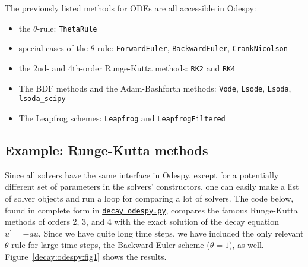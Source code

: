 \documentclass[graybox,sectrefs,envcountresetchap,open=right,final]{svmonodo}
\begin{document}
The previously listed methods for ODEs are all accessible in
Odespy:

\begin{itemize}
 \item the $\theta$-rule: \texttt{ThetaRule}

 \item special cases of the $\theta$-rule: \texttt{ForwardEuler}, \texttt{BackwardEuler},
   \texttt{CrankNicolson}

 \item the 2nd- and 4th-order Runge-Kutta methods: \texttt{RK2} and \texttt{RK4}

 \item The BDF methods and the Adam-Bashforth methods:
   \texttt{Vode}, \texttt{Lsode}, \texttt{Lsoda}, \Verb!lsoda_scipy!

 \item The Leapfrog schemes: \texttt{Leapfrog} and \texttt{LeapfrogFiltered}
\end{itemize}

\noindent
\subsection{Example: Runge-Kutta methods}

Since all solvers have the same interface in Odespy, except for a
potentially different set of
parameters in the solvers' constructors, one can easily make a list of
solver objects and run a loop for comparing a lot of solvers. The
code below, found in complete form in \href{{http://tinyurl.com/ofkw6kc/genz/decay_odespy.py}}{\nolinkurl{decay_odespy.py}},
compares the famous Runge-Kutta methods of orders 2, 3, and 4
with the exact solution of the decay equation
$u^{\prime}=-au$.
Since we have quite long time steps, we have included the only
relevant $\theta$-rule for large time steps, the Backward Euler scheme
($\theta=1$), as well.
Figure~\ref{decay:odespy:fig1} shows the results.
\end{document}
